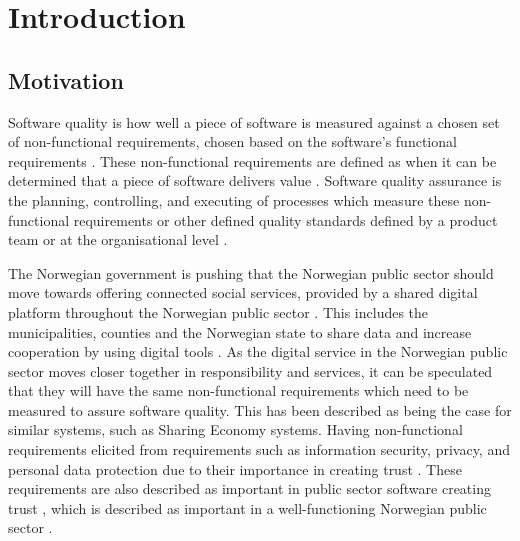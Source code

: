 \chapter{Introduction}

\section{Motivation} \label{sec:motivation}
Software quality is how well a piece of software is measured against a chosen set of non-functional requirements, chosen based on the software's functional requirements \cite{iso_25010:2011}. These non-functional requirements are defined as when it can be determined that a piece of software delivers value \cite{iso_25010:2011}. Software quality assurance is the planning, controlling, and executing of processes which measure these non-functional requirements or other defined quality standards defined by a product team or at the organisational level \cite{ieee_730_2014}\cite{sqa_wiki_2023}. 



The Norwegian government is pushing that the Norwegian public sector should move towards offering connected social services, provided by a shared digital platform throughout the Norwegian public sector \cite{r_2019}. This includes the municipalities, counties and the Norwegian state to share data and increase cooperation by using digital tools \cite{r_2019}. As the digital service in the Norwegian public sector moves closer together in responsibility and services, it can be speculated that they will have the same non-functional requirements which need to be measured to assure software quality. This has been described as being the case for similar systems, such as Sharing Economy systems. Having non-functional requirements elicited from requirements such as information security, privacy, and personal data protection due to their importance in creating trust \cite{is_2019}. These requirements are also described as important in public sector software creating trust \cite{la_2017}, which is described as important in a well-functioning Norwegian public sector \cite{oecd_2022}.

